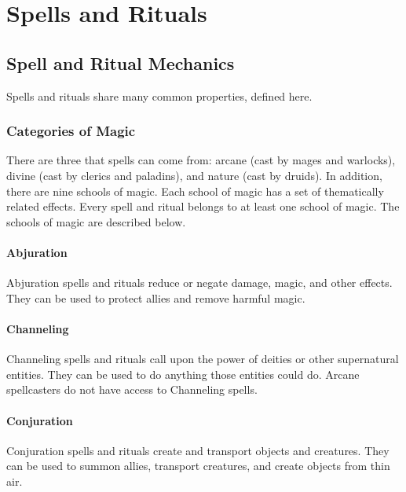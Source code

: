 \chapter{Spells and Rituals}\label{Spells}

\section{Spell and Ritual Mechanics}\label{Spell and Ritual Mechanics}

    Spells and rituals share many common properties, defined here.

    \subsection{Categories of Magic}
        There are three  that spells can come from: arcane (cast by mages and warlocks), divine (cast by clerics and paladins), and nature (cast by druids).
        In addition, there are nine schools of magic.
        Each school of magic has a set of thematically related effects.
        Every spell and ritual belongs to at least one school of magic.
        The schools of magic are described below.

        \subsubsection{Abjuration}
            Abjuration spells and rituals reduce or negate damage, magic, and other effects.
            They can be used to protect allies and remove harmful magic.

        \subsubsection{Channeling}
            Channeling spells and rituals call upon the power of deities or other supernatural entities.
            They can be used to do anything those entities could do.
            Arcane spellcasters do not have access to Channeling spells.

        \subsubsection{Conjuration}
            Conjuration spells and rituals create and transport objects and creatures.
            They can be used to summon allies, transport creatures, and create objects from thin air.

